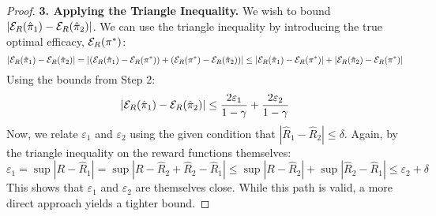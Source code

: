 \begin{proof}
\noindent\textbf{3. Applying the Triangle Inequality.}
We wish to bound $|\mathcal{E}_R(\hat{\pi}_1) - \mathcal{E}_R(\hat{\pi}_2)|$. We can use the triangle inequality by introducing the true optimal efficacy, $\mathcal{E}_R(\pi^*)$:
\[ |\mathcal{E}_R(\hat{\pi}_1) - \mathcal{E}_R(\hat{\pi}_2)| = |(\mathcal{E}_R(\hat{\pi}_1) - \mathcal{E}_R(\pi^*)) + (\mathcal{E}_R(\pi^*) - \mathcal{E}_R(\hat{\pi}_2))| \le |\mathcal{E}_R(\hat{\pi}_1) - \mathcal{E}_R(\pi^*)| + |\mathcal{E}_R(\hat{\pi}_2) - \mathcal{E}_R(\pi^*)| \]
Using the bounds from Step 2:
\[ |\mathcal{E}_R(\hat{\pi}_1) - \mathcal{E}_R(\hat{\pi}_2)| \le \frac{2\varepsilon_1}{1-\gamma} + \frac{2\varepsilon_2}{1-\gamma} \]
Now, we relate $\varepsilon_1$ and $\varepsilon_2$ using the given condition that $|\hat{R}_1 - \hat{R}_2| \le \delta$. Again, by the triangle inequality on the reward functions themselves:
\[ \varepsilon_1 = \sup |R - \hat{R}_1| = \sup |R - \hat{R}_2 + \hat{R}_2 - \hat{R}_1| \le \sup|R - \hat{R}_2| + \sup|\hat{R}_2 - \hat{R}_1| \le \varepsilon_2 + \delta \]
This shows that $\varepsilon_1$ and $\varepsilon_2$ are themselves close. While this path is valid, a more direct approach yields a tighter bound.


\end{proof}
